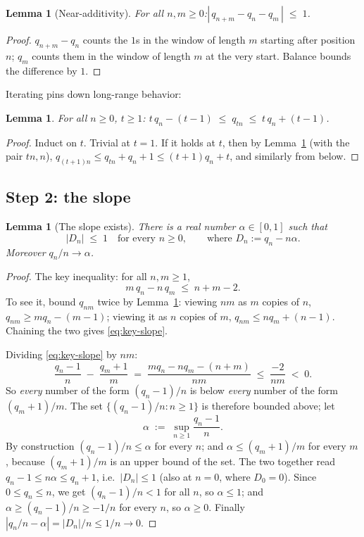 \documentclass[11pt,reqno]{amsart}
\theoremstyle{plain}
\newtheorem{lemma}[theorem]{Lemma}
\theoremstyle{definition}
\theoremstyle{remark}
\begin{document}
\begin{lemma}[Near-additivity]\label{lem:near-add}
For all $n, m \ge 0$:\quad $|\, q_{n+m} - q_n - q_m \,| \;\le\; 1$.
\end{lemma}

\begin{proof}
$q_{n+m} - q_n$ counts the $1$s in the window of length $m$ starting after position
$n$; $q_m$ counts them in the window of length $m$ at the very start. Balance bounds
the difference by $1$.
\end{proof}

Iterating pins down long-range behavior:

\begin{lemma}\label{lem:iterate}
For all $n \ge 0$, $t \ge 1$:\quad
$t\,q_n - (t-1) \;\le\; q_{tn} \;\le\; t\,q_n + (t-1)$.
\end{lemma}

\begin{proof}
Induct on $t$. Trivial at $t = 1$. If it holds at $t$, then by
Lemma~\ref{lem:near-add} (with the pair $tn, n$),
$q_{(t+1)n} \le q_{tn} + q_n + 1 \le (t+1)q_n + t$, and similarly from below.
\end{proof}

\subsection{Step 2: the slope}

\begin{lemma}[The slope exists]\label{lem:slope}
There is a real number $\alpha \in [0, 1]$ such that
\[
  |D_n| \;\le\; 1 \quad\text{for every } n \ge 0, \qquad\text{where } D_n := q_n -
  n\alpha .
\]
Moreover $q_n / n \to \alpha$.
\end{lemma}

\begin{proof}
The key inequality: for all $n, m \ge 1$,
\begin{equation}\label{eq:key-slope}
  m\,q_n - n\,q_m \;\le\; n + m - 2 .
\end{equation}
To see it, bound $q_{nm}$ twice by Lemma~\ref{lem:iterate}: viewing $nm$ as $m$
copies of $n$, $q_{nm} \ge m q_n - (m-1)$; viewing it as $n$ copies of $m$,
$q_{nm} \le n q_m + (n-1)$. Chaining the two gives \eqref{eq:key-slope}.

Dividing \eqref{eq:key-slope} by $nm$:
\[
  \frac{q_n - 1}{n} \;-\; \frac{q_m + 1}{m} \;=\;
  \frac{m q_n - n q_m - (n + m)}{nm} \;\le\; \frac{-2}{nm} \;<\; 0 .
\]
So \emph{every} number of the form $(q_n - 1)/n$ is below \emph{every} number of the
form $(q_m + 1)/m$. The set $\{(q_n - 1)/n : n \ge 1\}$ is therefore bounded above;
let
\[
  \alpha \;:=\; \sup_{n \ge 1} \frac{q_n - 1}{n} .
\]
By construction $(q_n - 1)/n \le \alpha$ for every $n$; and $\alpha \le
(q_m + 1)/m$ for every $m$, because $(q_m+1)/m$ is an upper bound of the set. The
two together read $q_n - 1 \le n\alpha \le q_n + 1$, i.e.\ $|D_n| \le 1$ (also at
$n = 0$, where $D_0 = 0$). Since $0 \le q_n \le n$, we get $(q_n - 1)/n < 1$ for
all $n$, so $\alpha \le 1$; and $\alpha \ge (q_n - 1)/n \ge -1/n$ for every $n$, so
$\alpha \ge 0$. Finally $|q_n/n - \alpha| = |D_n|/n \le 1/n \to 0$.
\end{proof}
\end{document}
